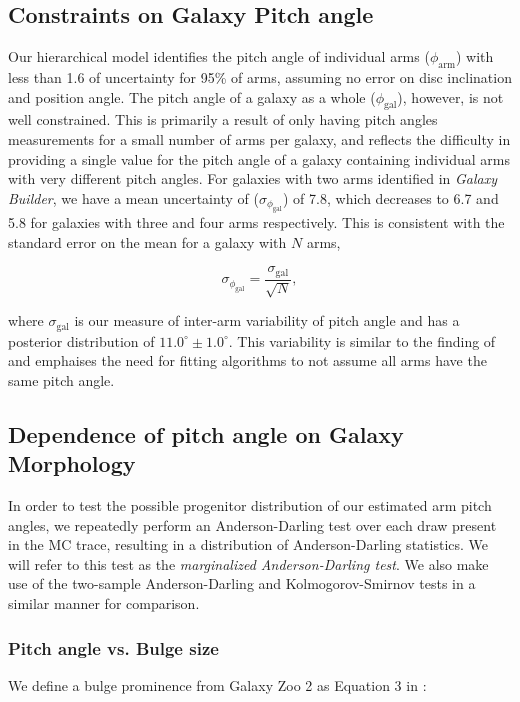 \subsection{Constraints on Galaxy Pitch angle}
Our hierarchical model identifies the pitch angle of individual arms ($\phi_\mathrm{arm}$) with less than {1.6\degree} of uncertainty for 95\% of arms, assuming no error on disc inclination and position angle. The pitch angle of a galaxy as a whole ($\phi_\mathrm{gal}$), however, is not well constrained. This is primarily a result of only having pitch angles measurements for a small number of arms per galaxy, and reflects the difficulty in providing a single value for the pitch angle of a galaxy containing individual arms with very different pitch angles. For galaxies with two arms identified in \textit{Galaxy Builder}, we have a mean uncertainty of ($\sigma_{\phi_\mathrm{gal}}$) of  {7.8\degree}, which decreases to {6.7\degree} and {5.8\degree} for galaxies with three and four arms respectively. This is consistent with the standard error on the mean for a galaxy with $N$ arms,

\begin{equation}
  \sigma_{\phi_\mathrm{gal}} = \frac{\sigma_\mathrm{gal}}{\sqrt{N}},
\end{equation}

where $\sigma_\mathrm{gal}$ is our measure of inter-arm variability of pitch angle and has a posterior distribution of $11.0^\circ\pm 1.0^\circ$. This variability is similar to the finding of \citet{2014ApJ...790...87D} and emphaises the need for fitting algorithms to not assume all arms have the same pitch angle.

\subsection{Dependence of pitch angle on Galaxy Morphology}
\label{section:morphology_comparision}
In order to test the possible progenitor distribution of our estimated arm pitch angles, we repeatedly perform an Anderson-Darling test \citep{10.2307/2286009} over each draw present in the MC trace, resulting in a distribution of Anderson-Darling statistics. We will refer to this test as the \textit{marginalized Anderson-Darling test}. We also make use of the two-sample Anderson-Darling \citep{doi:10.1080/01621459.1987.10478517} and Kolmogorov-Smirnov tests in a similar manner for comparison.

\subsubsection{Pitch angle vs. Bulge size}
We define a bulge prominence from Galaxy Zoo 2 as Equation 3 in \citet{2019MNRAS.487.1808M}:

